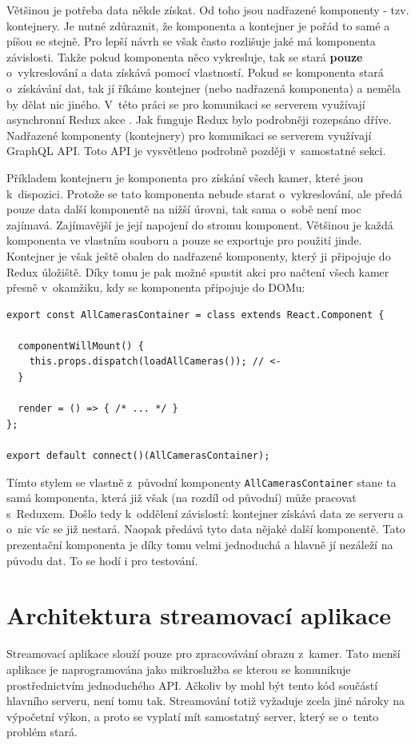 Většinou je potřeba data někde získat. Od toho jsou nadřazené komponenty - tzv. kontejnery. Je nutné zdůraznit, že komponenta a kontejner je pořád to samé a píšou se stejně. Pro lepší návrh se však často rozlišuje jaké má komponenta závislosti. Takže pokud komponenta něco vykresluje, tak se stará \textbf{pouze} o~vykreslování a data získává pomocí vlastností. Pokud se komponenta stará o~získávání dat, tak jí říkáme kontejner (nebo nadřazená komponenta) a neměla by dělat nic jiného. V~této práci se pro komunikaci se serverem využívají asynchronní Redux akce \cite{redux}. Jak funguje Redux bylo podrobněji rozepsáno dříve. Nadřazené komponenty (kontejnery) pro komunikaci se serverem využívají GraphQL API. Toto API je vysvětleno podrobně později v~samostatné sekci.

Příkladem kontejneru je komponenta pro získání všech kamer, které jsou k~dispozici. Protože se tato komponenta nebude starat o~vykreslování, ale předá pouze data další komponentě na nižší úrovni, tak sama o~sobě není moc zajímavá. Zajímavější je její napojení do stromu komponent. Většinou je každá komponenta ve vlastním souboru a pouze se exportuje pro použití jinde. Kontejner je však ještě obalen do nadřazené komponenty, který ji připojuje do Redux úložiště. Díky tomu je pak možné spustit akci pro načtení všech kamer přesně v~okamžiku, kdy se komponenta připojuje do DOMu:

\begin{verbatim}
export const AllCamerasContainer = class extends React.Component {

  componentWillMount() {
    this.props.dispatch(loadAllCameras()); // <-
  }

  render = () => { /* ... */ }
};

export default connect()(AllCamerasContainer);
\end{verbatim}

Tímto stylem se vlastně z~původní komponenty \texttt{AllCamerasContainer} stane ta samá komponenta, která již však (na rozdíl od původní) může pracovat s~Reduxem. Došlo tedy k~oddělení závislostí: kontejner získává data ze serveru a o~nic víc se již nestará. Naopak předává tyto data nějaké další komponentě. Tato prezentační komponenta je díky tomu velmi jednoduchá a hlavně jí nezáleží na původu dat. To se hodí i pro testování.


\section{Architektura streamovací aplikace}
Streamovací aplikace slouží pouze pro zpracovávání obrazu z~kamer. Tato menší aplikace je naprogramována jako mikroslužba se kterou se komunikuje prostřednictvím jednoduchého API. Ačkoliv by mohl být tento kód součástí hlavního serveru, není tomu tak. Streamování totiž vyžaduje zcela jiné nároky na výpočetní výkon, a proto se vyplatí mít samostatný server, který se o~tento problém stará.

